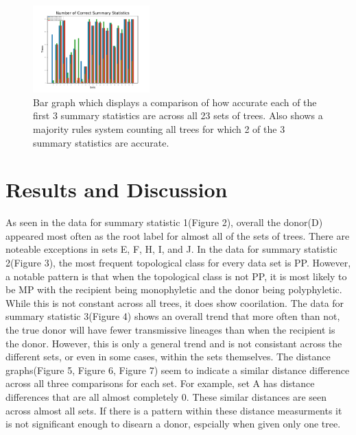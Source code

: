 \documentclass[final,5p,times,twocolumn,authoryear]{elsarticle}
\begin{document}
\begin{figure}
  \centering
  \includegraphics[width=0.4\textwidth, angle=0]{correctsumstats}
  \caption{Bar graph which displays a comparison of how accurate each of the first 3 summary statistics are across all 23 sets of trees. Also shows a majority rules system counting all trees for which 2 of the 3 summary statistics are accurate.}
  \label{fig_mom0}%
\end{figure}

\section{Results and Discussion}
\label{results and discussion}

As seen in the data for summary statistic 1(Figure 2), overall the donor(D) appeared most often as the root label for almost all of the sets of trees. There are noteable exceptions in sets E, F, H, I, and J. In the data for summary statistic 2(Figure 3), the most frequent topological class for every data set is PP. However, a notable pattern is that when the topological class is not PP, it is most likely to be MP with the recipient being monophyletic and the donor being polyphyletic. While this is not constant across all trees, it does show coorilation. The data for summary statistic 3(Figure 4) shows an overall trend that more often than not, the true donor will have fewer transmissive lineages than when the recipient is the donor. However, this is only a general trend and is not consistant across the different sets, or even in some cases, within the sets themselves. The distance graphs(Figure 5, Figure 6, Figure 7) seem to indicate a similar distance difference across all three comparisons for each set. For example, set A has distance differences that are all almost completely 0. These similar distances are seen across almost all sets. If there is a pattern within these distance measurments it is not significant enough to disearn a donor, espcially when given only one tree.
\end{document}
